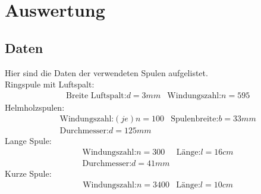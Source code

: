 \section{Auswertung}
\subsection{Daten}
Hier sind die Daten der verwendeten Spulen
aufgelistet.\\
\noindent Ringspule mit Luftspalt:\\
\begin{align*}
  &\text{Breite Luftspalt:} d=3mm &\text{Windungszahl:} n=595
\end{align*}
\noindent Helmholzspulen:\\
\begin{align*}
  &\text{Windungszahl:}(je) n=100 &\text{Spulenbreite:} b=33mm\\
  &\text{Durchmesser:} d=125mm
\end{align*}
Lange Spule:\\
\begin{align*}
  &\text{Windungszahl:} n=300 &\text{Länge:} l=16cm\\
  &\text{Durchmesser:} d=41mm
\end{align*}
Kurze Spule:\\
\begin{align*}
  &\text{Windungszahl:} n=3400 &\text{Länge:} l=10cm\\
\end{align*}
